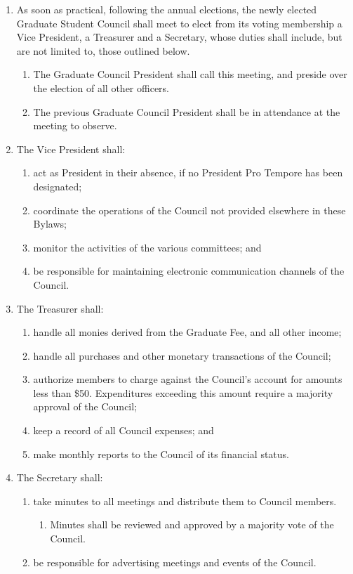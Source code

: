 \documentclass{union-doc}
\begin{document}

\begin{enumerate}
\item As soon as practical, following the annual elections, the newly elected Graduate Student Council shall meet to elect from its voting membership a Vice President, a Treasurer and a Secretary, whose duties shall include, but are not limited to, those outlined below.
  \begin{enumerate}
  \item The Graduate Council President shall call this meeting, and preside over the election of all other officers.
  \item The previous Graduate Council President shall be in attendance at the meeting to observe.
  \end{enumerate}
\item The Vice President shall:
  \begin{enumerate}
  \item act as President in their absence, if no President Pro Tempore has been designated;
  \item coordinate the operations of the Council not provided elsewhere in these Bylaws;
  \item monitor the activities of the various committees; and
  \item be responsible for maintaining electronic communication channels of the Council.
  \end{enumerate}
\item The Treasurer shall:
  \begin{enumerate}
  \item handle all monies derived from the Graduate Fee, and all other income;
  \item handle all purchases and other monetary transactions of the Council;
  \item authorize members to charge against the Council's account for amounts less than \$50. Expenditures exceeding this amount require a majority approval of the Council;
  \item keep a record of all Council expenses; and
  \item make monthly reports to the Council of its financial status.
  \end{enumerate}
\item The Secretary shall:
  \begin{enumerate}
  \item take minutes to all meetings and distribute them to Council members.
    \begin{enumerate}
    \item Minutes shall be reviewed and approved by a majority vote of the Council.
    \end{enumerate}
  \item be responsible for advertising meetings and events of the Council.
  \end{enumerate}
\end{enumerate}
\end{document}
